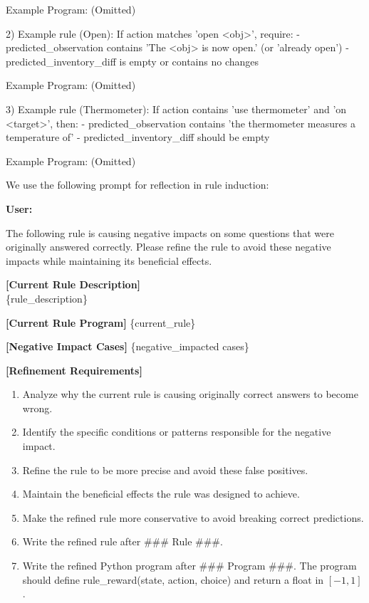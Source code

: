 \documentclass{article}
\theoremstyle{plain}
\theoremstyle{definition}
\theoremstyle{remark}
\begin{document}
\begin{tcolorbox}[
  title=Rule induction for ScienceWorld,
  colback=gray!5,
  colframe=black!50,
  fonttitle=\bfseries,
  breakable
]
Example Program: (Omitted)

2) Example rule (Open): If action matches 'open <obj>', require:
   - predicted\_observation contains 'The <obj> is now open.' (or 'already open')
   - predicted\_inventory\_diff is empty or contains no changes

Example Program: (Omitted)

3) Example rule (Thermometer): If action contains 'use thermometer' and 'on <target>', then:
   - predicted\_observation contains 'the thermometer measures a temperature of'
   - predicted\_inventory\_diff should be empty

Example Program: (Omitted)
\end{tcolorbox}
We use the following prompt for reflection in rule induction:
\begin{tcolorbox}[
  title=Prompt for reflection in rule induction,
  colback=gray!5,
  colframe=black!50,
  fonttitle=\bfseries,
  breakable
]
\textbf{User:}

The following rule is causing negative impacts on some questions that were originally answered correctly. Please refine the rule to avoid these negative impacts while maintaining its beneficial effects.

\textbf{[Current Rule Description]} \\
\{rule\_description\}

\textbf{[Current Rule Program]}
\{current\_rule\}

\textbf{[Negative Impact Cases]}
\{negative\_impacted cases\}

\textbf{[Refinement Requirements]}
\begin{enumerate}
  \item Analyze why the current rule is causing originally correct answers to become wrong.
  \item Identify the specific conditions or patterns responsible for the negative impact.
  \item Refine the rule to be more precise and avoid these false positives.
  \item Maintain the beneficial effects the rule was designed to achieve.
  \item Make the refined rule more conservative to avoid breaking correct predictions.
  \item Write the refined rule after \#\#\# Rule \#\#\#.
  \item Write the refined Python program after \#\#\# Program \#\#\#. The program should define rule\_reward(state, action, choice) and return a float in $[-1,1]$.
\end{enumerate}


\end{tcolorbox}
\end{document}
